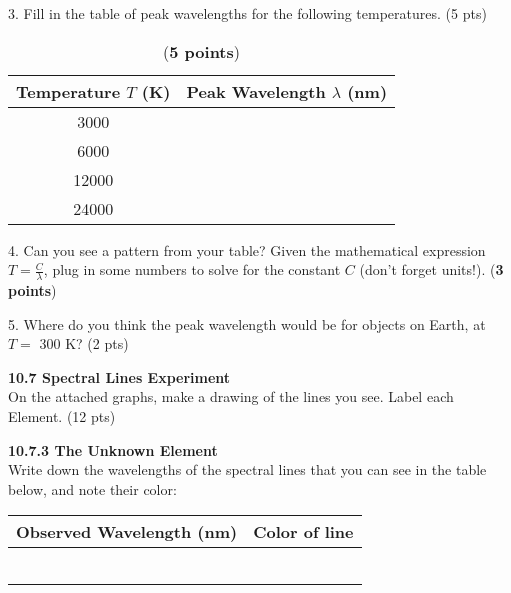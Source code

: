 \documentclass[notitlepage]{article}
\begin{document}
3. Fill in the table of peak wavelengths for the following temperatures. (5 pts)

\begin{table}[h]
\centering
\caption{{(\bf 5 points})}
\begin{tabular}{|c|c|}
\hline
Temperature $T$ (K) & Peak Wavelength $\lambda$ (nm) \\[0.2cm]
\hline
3000 & \\[0.2cm]
\hline
6000 & \\[0.2cm]
\hline
12000 & \\[0.2cm]
\hline
24000 & \\[0.2cm]
\hline

\end{tabular}
\end{table}

4. Can you see a pattern from your table?  Given the mathematical expression
$T  = \frac{C}{\lambda}$,
plug in some numbers to solve for the constant $C$ (don't forget units!).  ({\bf 3 points})
\vspace{3cm}



5. Where do you think the peak wavelength would be for objects on Earth, at $T =$ 300 K? (2 pts)

\vspace{2cm}


\large{\bf 10.7 Spectral Lines Experiment}\\

On the attached graphs, make a drawing of the lines you see.  Label each Element. (12 pts)
\vspace{1cm}


\large\textbf{10.7.3 The Unknown Element}\\

Write down the wavelengths of the spectral lines that you can see in the table below, and note their color:



\begin{table}[h]
\centering
\begin{tabular}{|c|c|}
\hline
Observed Wavelength (nm) & Color of line \\[0.2cm]
\hline
 & \\[0.2cm]
\hline
 & \\[0.2cm]
\hline
 & \\[0.2cm]
\hline
 & \\[0.2cm]
\hline
 & \\[0.2cm]
\hline
 & \\[0.2cm]
\hline

\end{tabular}
\end{table}
\end{document}
